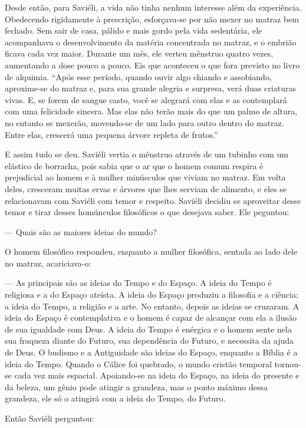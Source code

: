 Desde então, para Saviéli, a vida não tinha nenhum interesse além da
experiência. Obedecendo rigidamente à prescrição, esforçava-se por não
mexer no matraz bem fechado. Sem sair de casa, pálido e mais gordo pela
vida sedentária, ele acompanhava o desenvolvimento da matéria
concentrada no matraz, e o embrião ficava cada vez maior. Durante um
mês, ele verteu mênstruo quatro vezes, aumentando a dose pouco a pouco.
Eis que aconteceu o que fora previsto no livro de alquimia. ``Após esse
período, quando ouvir algo chiando e assobiando, aproxime-se do matraz
e, para sua grande alegria e surpresa, verá duas criaturas vivas. E, se
forem de sangue casto, você se alegrará com elas e as contemplará com
uma felicidade sincera. Mas elas não terão mais do que um palmo de
altura, no entanto se mexerão, movendo-se de um lado para outro dentro
do matraz. Entre elas, crescerá uma pequena árvore repleta de frutos.''

E assim tudo se deu. Saviéli vertia o mênstruo através de um tubinho com
um elástico de borracha, pois sabia que o ar que o homem comum respira é
prejudicial ao homem e à mulher minúsculos que viviam no matraz. Em
volta deles, cresceram muitas ervas e árvores que lhes serviam de
alimento, e eles se relacionavam com Saviéli com temor e respeito.
Saviéli decidiu se aproveitar desse temor e tirar desses homúnculos
filosóficos o que desejava saber. Ele peguntou:

--- Quais são as maiores ideias do mundo?

O homem filosófico respondeu, enquanto a mulher filosófica, sentada ao
lado dele no matraz, acariciava-o:

--- As principais são as ideias do Tempo e do Espaço. A ideia do Tempo é
religiosa e a do Espaço ateísta. A ideia do Espaço produziu a filosofia
e a ciência; a ideia do Tempo, a religião e a arte. No entanto, depois
as ideias se cruzaram. A ideia do Espaço é contemplativa e o homem é
capaz de alcançar com ela a ilusão de sua igualdade com Deus. A ideia do
Tempo é enérgica e o homem sente nela sua fraqueza diante do Futuro, sua
dependência do Futuro, e necessita da ajuda de Deus. O budismo e a
Antiguidade são ideias do Espaço, enquanto a Bíblia é a ideia do Tempo.
Quando o Cálice foi quebrado, o mundo cristão temporal tornou-se cada
vez mais espacial. Apoiando-se na ideia do Espaço, na ideia do presente
e da beleza, um gênio pode atingir a grandeza, mas o ponto máximo dessa
grandeza, ele só o atingirá com a ideia do Tempo, do Futuro.

Então Saviéli perguntou:


